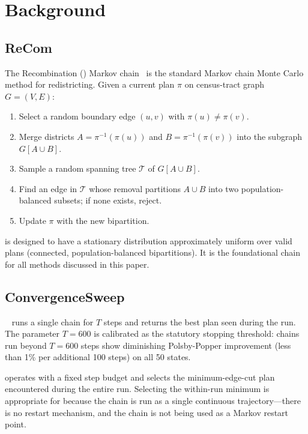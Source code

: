 \section{Background}
\label{sec:background}

\subsection{ReCom}

The Recombination (\recom{}) Markov chain~\citep{deford2021} is the
standard Markov chain Monte Carlo method for redistricting.
Given a current plan $\pi$ on census-tract graph $G = (V, E)$:
\begin{sloppypar}
\begin{enumerate}
\item Select a random boundary edge $(u, v)$ with $\pi(u) \neq \pi(v)$.
\item Merge districts $A = \pi^{-1}(\pi(u))$ and $B = \pi^{-1}(\pi(v))$
      into the subgraph $G[A \cup B]$.
\item Sample a random spanning tree $\mathcal{T}$ of $G[A \cup B]$.
\item Find an edge in $\mathcal{T}$ whose removal partitions $A \cup B$
      into two population-balanced subsets; if none exists, reject.
\item Update $\pi$ with the new bipartition.
\end{enumerate}
\end{sloppypar}

\recom{} is designed to have a stationary distribution approximately
uniform over valid plans (connected, population-balanced bipartitions).
It is the foundational chain for all methods discussed in this paper.

\subsection{ConvergenceSweep}

\cs{}~\citep{b16paper} runs a single \recom{} chain for $T$ steps
and returns the best plan seen during the run.
The parameter $T = 600$ is calibrated as the statutory stopping threshold:
chains run beyond $T = 600$ steps show diminishing Polsby-Popper improvement
(less than 1\% per additional 100 steps) on all 50 states.

\cs{} operates with a fixed step budget and selects the minimum-edge-cut
plan encountered during the entire run.
Selecting the within-run minimum is appropriate for \cs{} because the
chain is run as a single continuous trajectory---there is no restart
mechanism, and the chain is not being used as a Markov restart point.

